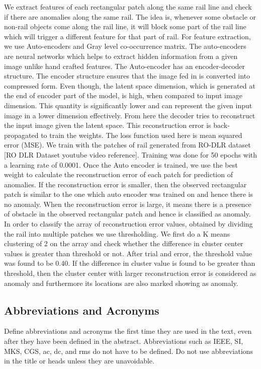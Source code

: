 \documentclass[conference]{IEEEtran}
\begin{document}
We extract features of each rectangular patch along the same rail line and check if there are anomalies along the same rail. The idea is, whenever some obstacle or non-rail objects come along the rail line, it will block some part of the rail line which will trigger a different feature for that part of rail. For feature extraction, we use Auto-encoders and Gray level co-occurrence matrix. The auto-encoders are neural networks which helps to extract hidden information from a given image unlike hand crafted features. The Auto-encoder has an encoder-decoder structure. The encoder structure ensures that the image fed in is converted into compressed form. Even though, the latent space dimension, which is generated at the end of encoder part of the model, is high, when compared to input image dimension. This quantity is significantly lower and can represent the given input image in a lower dimension effectively. From here the decoder tries to reconstruct the input image given the latent space. This reconstruction error is back-propagated to train the weights. The loss function used here is mean squared error (MSE). We train with the patches of rail generated from RO-DLR dataset [RO DLR Dataset youtube video reference]. Training was done for 50 epochs with a learning rate of 0.0001. Once the Auto encoder is trained, we use the best weight to calculate the reconstruction error of each patch for prediction of anomalies. If the reconstruction error is smaller, then the observed rectangular patch is similar to the one which auto encoder was trained on and hence there is no anomaly. When the reconstruction error is large, it means there is a presence of obstacle in the observed rectangular patch and hence is classified as anomaly. In order to classify the array of reconstruction error values, obtained by dividing the rail into multiple patches we use thresholding. We first do a K means clustering of 2 on the array and check whether the difference in cluster center values is greater than threshold or not. After trial and error, the threshold value was found to be 0.40. If the difference in cluster value is found to be greater than threshold, then the cluster center with larger reconstruction error is considered as anomaly and furthermore its locations are also marked showing as anomaly.

\subsection{Abbreviations and Acronyms}\label{AA}
Define abbreviations and acronyms the first time they are used in the text, 
even after they have been defined in the abstract. Abbreviations such as 
IEEE, SI, MKS, CGS, ac, dc, and rms do not have to be defined. Do not use 
abbreviations in the title or heads unless they are unavoidable.
\end{document}

